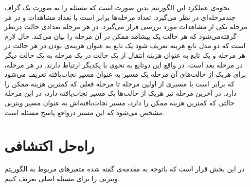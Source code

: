 	 نحوه‌ی عملکرد این الگوریتم بدین صورت است که مسئله را به صورت یک گراف چندمرحله‌ای در نظر می‌گیرد. تعداد مرحله‌ها برابر است با تعداد مشاهدات و در هر مرحله یکی از مشاهدات مورد بررسی قرار می‌گیرد. در هر مرحله تعدادی حالت درنظر گرفته‌می‌شود که هر حالت یک پیشامد ممکن در آن مرحله را بیان می‌کند. حال لازم است که دو مدل تابع هزینه تعریف شود یک تابع به عنوان هزینه‌ی بودن در هر حالت در هر مرحله و یک تابع به عنوان هزینه انتقال از یک حالت در یک مرحله به یک حالت دیگر در مرحله بعد است، در واقع این دوتابع به نحوی با یکدیگر ارتباط دارند. در هر مرحله، برای هریک از حالت‌های آن مرحله یک مسیر به عنوان مسیر نجات‌یافته تعریف می‌شود که برابر است با مسیری از اولین مرحله تا مرحله فعلی که کمترین هزینه ممکن را دارد. در آخرین مرحله نیز هریک از حالت‌ها یک مسیر نجات‌یافته دارد، در این مرحله حالتی که کمترین هزینه ممکن را دارد، مسیر نجات‌یافته‌اش به عنوان مسیر ویتربی مشخص می‌شود که این مسیر درواقع پاسخ مسئله است. 
\section{راه‌حل اکتشافی}	 
	در این بخش قرار است که باتوجه به مقدمه‌ی گفته شده متغیرهای مربوط به الگوریتم ویتربی را برای مسئله اصلی تعریف کنیم. 
	
